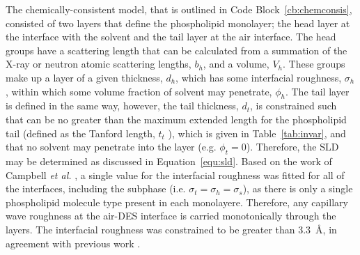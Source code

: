 The chemically-consistent model, that is outlined in Code Block~\ref{cb:chemconsis}, consisted of two layers that define the phospholipid monolayer; the head layer at the interface with the solvent and the tail layer at the air interface.
The head groups have a scattering length that can be calculated from a summation of the X-ray or neutron atomic scattering lengths, $b_h$, and a volume, $V_h$.
These groups make up a layer of a given thickness, $d_h$, which has some interfacial roughness, $\sigma_h$, within which some volume fraction of solvent may penetrate, $\phi_h$.
The tail layer is defined in the same way, however, the tail thickness, $d_t$, is constrained such that can be no greater than the maximum extended length for the phospholipid tail (defined as the Tanford length, $t_t$ \cite{tanford_hydrophobic_1980}), which is given in Table~\ref{tab:invar}, and that no solvent may penetrate into the layer (e.g. $\phi_t=0$).
Therefore, the $\text{SLD}$ may be determined as discussed in Equation~\ref{equ:sld}.
Based on the work of Campbell \emph{et al.} \cite{campbell_structure_2018}, a single value for the interfacial roughness was fitted for all of the interfaces, including the subphase (i.e. $\sigma_t = \sigma_h = \sigma_s$), as there is only a single phospholipid molecule type present in each monolayere.
Therefore, any capillary wave roughness at the air-DES interface is carried monotonically through the layers. The interfacial roughness was constrained to be greater than \SI{3.3}{\angstrom}, in agreement with previous work \cite{sanchez-fernandez_micellization_2016}.
%
